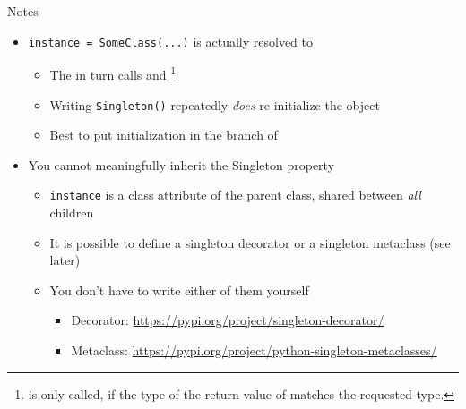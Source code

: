 
\begin{frame}{Notes}
%
\begin{itemize}
\item \texttt{instance = SomeClass(...)} is actually resolved to 
	\begin{itemize}
	\item The  in turn calls  and \footnote{%
		 is only called, if the type of the return value of  matches the requested type.
		} 
	\item Writing \texttt{Singleton()} repeatedly \emph{does} re-initialize the object
	\item[\Thus] Best to put initialization in the  branch of 
	\end{itemize}
\item You cannot meaningfully inherit the Singleton property
	\begin{itemize}
	\item \texttt{instance} is a class attribute of the parent class, shared between \emph{all} children
	\item It is possible to define a singleton decorator or a singleton metaclass (see later)
	\item You don't have to write either of them yourself
		\begin{itemize}
		\item Decorator: \url{https://pypi.org/project/singleton-decorator/}
		\item Metaclass: \url{https://pypi.org/project/python-singleton-metaclasses/}
		\end{itemize}
	\end{itemize}
\end{itemize}
%
\end{frame}


